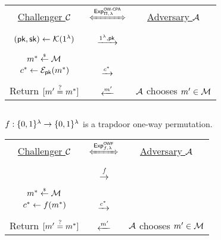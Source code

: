 \documentclass{article}
\begin{document}
\begin{tcolorbox}[colback=white]
	\centering
	\begin{tabularx}{\linewidth}{CcC}
		\underline{Challenger $\mathcal{C}$} & 
		$\xLeftrightarrow{\Exp^{\owcpa}_{\sch, \sp}}$ & 
		\underline{Adversary $\mathcal{A}$} \\

		 \\

		$(\textsf{pk}, \textsf{sk}) \gets \mathcal{K}(1^{\lambda})$ & 
		$\xrightarrow{1^{\lambda}, \textsf{pk}}$ & 
	   \\

		 \\

		$m^* \overset{{\scriptscriptstyle\$}}{\leftarrow} \mathcal{M}$ \\
		$c^* \gets \mathcal{E}_{\textsf{pk}}(m^*)$ &
		$\xrightarrow{c^*}$ &
		 \\

		 \\

		Return $[m' \overset{?}{=} m^*]$ & 
		$\xleftarrow{m'}$ & 
		$\mathcal{A}$ chooses $m' \in \mathcal{M}$ \\
  \end{tabularx}
\end{tcolorbox}


\subsection{\owf}

$f:\{0, 1\}^{\lambda} \to \{0, 1\}^{\lambda}$ is a trapdoor one-way permutation.

\begin{tcolorbox}[colback=white]
	\centering
	\begin{tabularx}{\linewidth}{CcC}
		\underline{Challenger $\mathcal{C}$} & 
		$\xLeftrightarrow{\Exp^{\owf}_{f, \sp}}$ & 
		\underline{Adversary $\mathcal{A}$} \\

		 \\

		& 
		$\xrightarrow{f}$ & 
	     \\

		 \\

		$m^* \overset{{\scriptscriptstyle\$}}{\leftarrow} \mathcal{M}$ \\
		$c^* \gets f(m^*)$ &
		$\xrightarrow{c^*}$ &
		 \\

		 \\

		Return $[m' \overset{?}{=} m^*]$ & 
		$\xleftarrow{m'}$ & 
		$\mathcal{A}$ chooses $m' \in \mathcal{M}$ \\
  \end{tabularx}
\end{tcolorbox}
\end{document}
